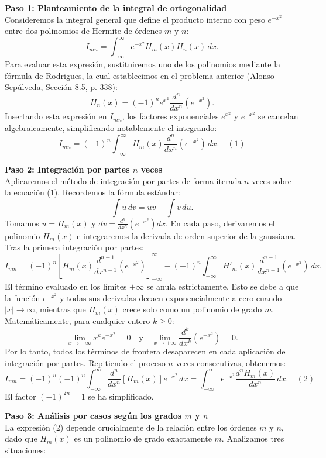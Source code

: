 \documentclass[a4paper]{article}
\begin{document}
\vspace{0.3cm}
\noindent\textbf{Paso 1: Planteamiento de la integral de ortogonalidad} \\
Consideremos la integral general que define el producto interno con peso $e^{-x^2}$ entre dos polinomios de Hermite de órdenes $m$ y $n$:
$$
I_{mn} = \int_{-\infty}^{\infty} e^{-x^2} H_m(x) H_n(x) \, dx.
$$
Para evaluar esta expresión, sustituiremos uno de los polinomios mediante la fórmula de Rodrigues, la cual establecimos en el problema anterior (Alonso Sepúlveda, Sección 8.5, p. 338):
$$
H_n(x) = (-1)^n e^{x^2} \frac{d^n}{dx^n} \left( e^{-x^2} \right).
$$
Insertando esta expresión en $I_{mn}$, los factores exponenciales $e^{x^2}$ y $e^{-x^2}$ se cancelan algebraicamente, simplificando notablemente el integrando:
$$
I_{mn} = (-1)^n \int_{-\infty}^{\infty} H_m(x) \frac{d^n}{dx^n} \left( e^{-x^2} \right) \, dx. \quad (1)
$$

\vspace{0.3cm}
\noindent\textbf{Paso 2: Integración por partes $n$ veces} \\
Aplicaremos el método de integración por partes de forma iterada $n$ veces sobre la ecuación (1). Recordemos la fórmula estándar:
$$
\int u \, dv = uv - \int v \, du.
$$
Tomamos $u = H_m(x)$ y $dv = \frac{d^n}{dx^n}(e^{-x^2}) dx$. En cada paso, derivaremos el polinomio $H_m(x)$ e integraremos la derivada de orden superior de la gaussiana. Tras la primera integración por partes:
$$
I_{mn} = (-1)^n \left[ H_m(x) \frac{d^{n-1}}{dx^{n-1}}(e^{-x^2}) \right]_{-\infty}^{\infty} - (-1)^n \int_{-\infty}^{\infty} H'_m(x) \frac{d^{n-1}}{dx^{n-1}}(e^{-x^2}) \, dx.
$$
El término evaluado en los límites $\pm \infty$ se anula estrictamente. Esto se debe a que la función $e^{-x^2}$ y todas sus derivadas decaen exponencialmente a cero cuando $|x| \to \infty$, mientras que $H_m(x)$ crece solo como un polinomio de grado $m$. Matemáticamente, para cualquier entero $k \geq 0$:
$$
\lim_{x \to \pm \infty} x^k e^{-x^2} = 0 \quad \text{y} \quad \lim_{x \to \pm \infty} \frac{d^k}{dx^k}(e^{-x^2}) = 0.
$$
Por lo tanto, todos los términos de frontera desaparecen en cada aplicación de integración por partes. Repitiendo el proceso $n$ veces consecutivas, obtenemos:
$$
I_{mn} = (-1)^n (-1)^n \int_{-\infty}^{\infty} \frac{d^n}{dx^n} \left[ H_m(x) \right] e^{-x^2} \, dx = \int_{-\infty}^{\infty} e^{-x^2} \frac{d^n H_m(x)}{dx^n} \, dx. \quad (2)
$$
El factor $(-1)^{2n} = 1$ se ha simplificado.

\vspace{0.3cm}
\noindent\textbf{Paso 3: Análisis por casos según los grados $m$ y $n$} \\
La expresión (2) depende crucialmente de la relación entre los órdenes $m$ y $n$, dado que $H_m(x)$ es un polinomio de grado exactamente $m$. Analizamos tres situaciones:
\end{document}
